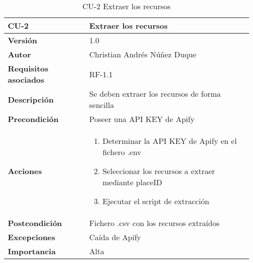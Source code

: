 \begin{table}[p]
	\centering
	\begin{tabularx}{\linewidth}{ p{} p{} }
		\toprule
		\textbf{CU-2}    & \textbf{Extraer los recursos}\\
		\toprule
		\textbf{Versión}              & 1.0    \\
		\textbf{Autor}                & Christian Andrés Núñez Duque \\
		\textbf{Requisitos asociados} & RF-1.1 \\
		\textbf{Descripción}          & Se deben extraer los recursos de forma sencilla \\
		\textbf{Precondición}         & Poseer una API KEY de Apify \\
		\textbf{Acciones}             &
		\begin{enumerate}
			\def\labelenumi{\arabic{enumi}.}
			\tightlist
			\item Determinar la API KEY de Apify en el fichero .env
			\item Seleccionar los recursos a extraer mediante placeID
			\item Ejecutar el script de extracción
		\end{enumerate}\\
		\textbf{Postcondición}        & Fichero .csv con los recursos extraídos \\
		\textbf{Excepciones}          & Caída de Apify \\
		\textbf{Importancia}          & Alta \\
		\bottomrule
	\end{tabularx}
	\caption{CU-2 Extraer los recursos}
\end{table}


